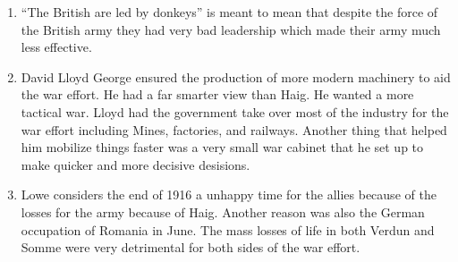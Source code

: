 \documentclass[12pt]{article}
\begin{document}
\begin{enumerate}
  \item ``The British are led by donkeys'' is meant to mean that despite the force of the British army they had very bad leadership which made their army much less effective.
  \item David Lloyd George ensured the production of more modern machinery to aid the war effort. He had a far smarter view than Haig. He wanted a more tactical war. Lloyd had the government take over most of the industry for the war effort including Mines, factories, and railways. Another thing that helped him mobilize things faster was a very small war cabinet that he set up to make quicker and more decisive desisions.
  \item Lowe considers the end of 1916 a unhappy time for the allies because of the losses for the army because of Haig. Another reason was also the German occupation of Romania in June. The mass losses of life in both Verdun and Somme were very detrimental for both sides of the war effort.
\end{enumerate}
\end{document}
